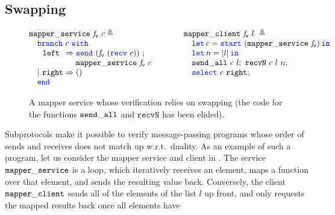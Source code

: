 \subsection{Swapping}
\label{sec:subprotocol_swapping}

\newcommand{\recvallnamefixed}{\mathtt{recvN}}

\newcommand{\mapperfig}{
\begin{figure}[t!]
\begin{equation*}
\begin{array}[t]{@{} l @{}}
  \mapperservicename\ \vmapvar\ \chan \eqdef\\
  \quad
  \begin{array}[t]{@{} l @{}}
    \mbranchA{\chan}
    {\begin{array}[t]{@{} l @{}}
       \send {(\vmapvar\ (\recv \chan))};\\
       \mapperservicename\ \vmapvar\ \chan
     \end{array}}
    {\TT}
  \end{array}
\end{array}
\qquad\qquad
\begin{array}[t]{@{} l @{}}
  \mapperclientname\ \vmapvar\ l\ \eqdef\\
  \quad
  \begin{array}[t]{@{} l @{}}
    \Let {\chan} = {\start {(\mapperservicename\ \vmapvar)}} in\\
    \Let {n} = \listlength{l} in\\
    \sendallname\ \chan\ l;\
    \recvallnamefixed\ \chan\ l\ n;\\
    \select{\chan}{\rightname};
  \end{array}
\end{array}
\end{equation*}
\caption{A mapper service whose verification relies on swapping
(the code for the functions $\sendallname$ and $\recvallnamefixed$ has been elided).}
\label{fig:mapper}
\end{figure}
}
\mapperfig
Subprotocols make it possible to verify message-passing
programs whose order of sends and receives does not match up w.r.t.\
duality.
As an example of such a program, let us consider the mapper service and client in
.
The service $\mathtt{mapper\_service}$ is a loop, which iteratively receives an element,
maps a function over that element, and sends the resulting value back.
Conversely, the client $\mathtt{mapper\_client}$ sends all of the elements of the list
$l$ up front, and only requests the mapped results back once all elements have
